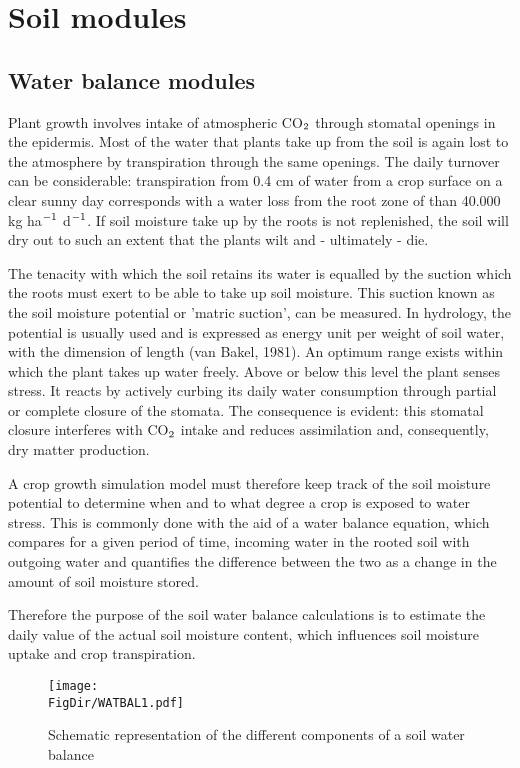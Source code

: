 \chapter{Soil modules}

\section{Water balance modules}

Plant growth involves intake of atmospheric CO$_{{\rm 2}}$ through stomatal openings in the
epidermis. Most of the water that plants take up from the soil is again lost to the
atmosphere by transpiration through the same openings. The daily turnover can be
considerable: transpiration from 0.4 cm of water from a crop surface on a clear sunny
day corresponds with a water loss from the root zone of than 40.000 kg ha$^{{\rm -1}}$ 
d$^{{\rm -1}}$. If soil
moisture take up by the roots is not replenished, the soil will dry out to such an extent
that the plants wilt and - ultimately - die.

The tenacity with which the soil retains its water is equalled by the suction which the
roots must exert to be able to take up soil moisture. This suction known as the soil
moisture potential or 'matric suction', can be measured. In hydrology, the potential is
usually used and is expressed as energy unit per weight of soil water, with the dimension
of length (van Bakel, 1981). An optimum range exists within which the plant takes up
water freely. Above or below this level the plant senses stress. It reacts by actively
curbing its daily water consumption through partial or complete closure of the stomata.
The consequence is evident: this stomatal closure interferes with CO$_{{\rm 2}}$ intake and 
reduces assimilation and, consequently, dry matter production.

A crop growth simulation model must therefore keep track of the soil moisture potential
to determine when and to what degree a crop is exposed to water stress. This is commonly 
done with the aid of a water balance equation, which compares for a given period of
time, incoming water in the rooted soil with outgoing water and quantifies the difference
between the two as a change in the amount of soil moisture stored.

Therefore the purpose of the soil water balance calculations is to estimate the daily value
of the actual soil moisture content, which influences soil moisture uptake and crop
transpiration.

\begin{figure}[p]
	\centering
	\texttt{[image: \\FigDir/WATBAL1.pdf]}
	\caption{Schematic representation of the different components of a soil water balance}
	\label{fig:WatBalSchematic}
\end{figure}

